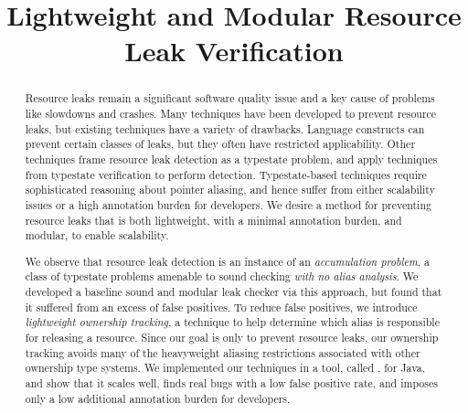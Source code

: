 \documentclass[sigplan,10pt,review,anonymous]{acmart}
\begin{document}


\title{Lightweight and Modular Resource Leak Verification}




\begin{abstract}
  Resource leaks remain a significant software quality issue and a key
  cause of problems like slowdowns and crashes.  Many techniques have
  been developed to prevent resource leaks, but existing techniques
  have a variety of drawbacks.  Language constructs can prevent
  certain classes of leaks, but they often have restricted
  applicability.  Other techniques frame resource leak detection as a
  typestate problem, and apply techniques from typestate verification
  to perform detection.  Typestate-based techniques require
  sophisticated reasoning about pointer aliasing, and hence suffer
  from either scalability issues or a high annotation burden for
  developers.  We desire a method for preventing resource leaks that
  is both lightweight, with a minimal annotation burden, and modular,
  to enable scalability.

  We observe that resource leak detection is an instance of an
  \emph{accumulation problem}, a class of typestate problems amenable
  to sound checking \emph{with no alias analysis}.  We developed a
  baseline sound and modular leak checker via this approach, but found
  that it suffered from an excess of false positives.  To reduce false
  positives, we introduce \emph{lightweight ownership tracking}, a
  technique to help determine which alias is responsible for releasing
  a resource.  Since our goal is only to prevent resource leaks, our
  ownership tracking avoids many of the heavyweight aliasing
  restrictions associated with other ownership type systems.  We
  implemented our techniques in a tool, called \tool, for Java, and show that it
  scales well, finds real bugs with a low false positive rate, and
  imposes only a low additional annotation burden for developers.
\end{abstract}
\end{document}

